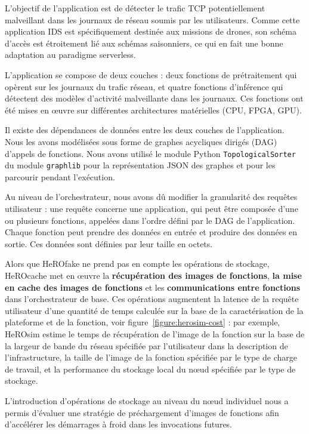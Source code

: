 L'objectif de l'application est de détecter le trafic TCP potentiellement malveillant dans les journaux de réseau soumis par les utilisateurs. Comme cette application IDS est spécifiquement destinée aux missions de drones, son schéma d'accès est étroitement lié aux schémas saisonniers, ce qui en fait une bonne adaptation au paradigme serverless.

L'application se compose de deux couches : deux fonctions de prétraitement qui opèrent sur les journaux du trafic réseau, et quatre fonctions d'inférence qui détectent des modèles d'activité malveillante dans les journaux. Ces fonctions ont été mises en œuvre sur différentes architectures matérielles (CPU, FPGA, GPU). 

Il existe des dépendances de données entre les deux couches de l'application. Nous les avons modélisées sous forme de graphes acycliques dirigés (DAG) d'appels de fonctions. Nous avons utilisé le module Python \texttt{TopologicalSorter} du module \texttt{graphlib} pour la représentation JSON des graphes et pour les parcourir pendant l'exécution.

Au niveau de l'orchestrateur, nous avons dû modifier la granularité des requêtes utilisateur : une requête concerne une application, qui peut être composée d'une ou plusieurs fonctions, appelées dans l'ordre défini par le DAG de l'application. Chaque fonction peut prendre des données en entrée et produire des données en sortie. Ces données sont définies par leur taille en octets.

Alors que HeROfake ne prend pas en compte les opérations de stockage, HeROcache met en œuvre la \textbf{récupération des images de fonctions}, \textbf{la mise en cache des images de fonctions} et les \textbf{communications entre fonctions} dans l'orchestrateur de base. Ces opérations augmentent la latence de la requête utilisateur d'une quantité de temps calculée sur la base de la caractérisation de la plateforme et de la fonction, voir figure~\ref{figure:herosim-cost} : par exemple, HeROsim estime le temps de récupération de l'image de la fonction sur la base de la largeur de bande du réseau spécifiée par l'utilisateur dans la description de l'infrastructure, la taille de l'image de la fonction spécifiée par le type de charge de travail, et la performance du stockage local du nœud spécifiée par le type de stockage.

L'introduction d'opérations de stockage au niveau du nœud individuel nous a permis d'évaluer une stratégie de préchargement d'images de fonctions afin d'accélérer les démarrages à froid dans les invocations futures.

